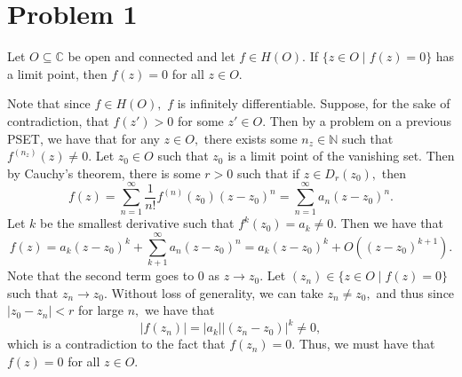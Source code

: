 \documentclass[11pt]{article}
\newcommand{\bbC}{\mathbb{C}}
\newcommand{\bbN}{\mathbb{N}}
\begin{document}
	
	\psetheader
\section*{Problem 1}
\begin{problem}
    Let $O\subseteq \bbC$ be open and connected and let $f\in H(O).$ If $\{z \in O \mid f(z) = 0\}$ has a limit point, then $f(z) = 0$ for all $z\in O.$
\end{problem}
\begin{solution}
Note that since $f\in H(O),$ $f$ is infinitely differentiable. Suppose, for the sake of contradiction, that $f(z') >0$ for some $z' \in O.$ Then by a problem on a previous PSET, we have that for any $z\in O,$ there exists some $n_z  \in \bbN$ such that $f^{(n_z)}(z) \neq 0.$ Let $z_0 \in O$ such that $z_0$ is a limit point of the vanishing set. Then by Cauchy's theorem, there is some $r>0$ such that if $z \in D_r(z_0),$ then 
\[f(z) = \sum_{n=1}^\infty \frac{1}{n!}f^{(n)}(z_0) (z - z_0)^n = \sum_{n=1}^\infty a_n (z - z_0)^n.\] Let $k$ be the smallest derivative such that $f^{k}(z_0) = a_k \neq 0.$ Then we have that 
\[f(z) = a_k(z - z_0)^k + \sum_{k+1}^\infty a_n (z - z_0)^n = a_k(z - z_0)^k + O((z - z_0)^{k+1}).\] Note that the second term goes to $0$ as $z \to z_0.$ Let $(z_n) \in \{z \in O \mid f(z)  = 0\}$ such that $z_n \to z_0.$ Without loss of generality, we can take $z_n \neq z_0,$ and thus since $|z_0 - z_n| < r$ for large $n,$ we have that 
\[|f(z_n)| = |a_k||(z_n - z_0)|^k \neq 0,\] which is a contradiction to the fact that $f(z_n) = 0.$ Thus, we must have that $f(z) = 0$ for all $z \in O.$
\end{solution}

\newpage
\end{document}
